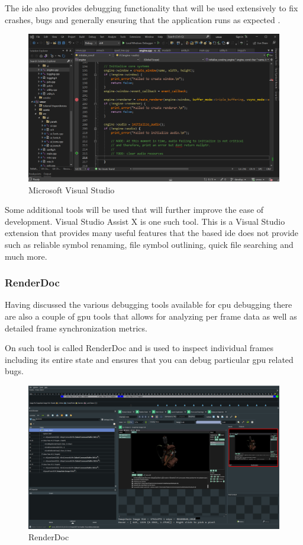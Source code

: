 \documentclass[11pt]{article}
\begin{document}
The \gls{ide} also provides debugging functionality that will be used
extensively to fix crashes, bugs and generally ensuring that the application
runs as expected \cite{visualstudio}. 

\begin{figure}[h!]
  \centering
  \includegraphics[width=\textwidth]{images/visual_studio.png}
  \caption{Microsoft Visual Studio}
  \label{fig:visual_studio}
\end{figure}

Some additional tools will be used that will further improve the ease of
development.  Visual Studio Assist X \cite{visualstudioassistx} is one such
tool. This is a Visual Studio extension that provides many useful features that
the based \gls{ide} does not provide such as reliable symbol renaming, file symbol
outlining, quick file searching and much more.


\subsubsection{RenderDoc}
Having discussed the various debugging tools available for \gls{cpu} debugging
there are also a couple of \gls{gpu} tools that allows for analyzing per frame
data as well as detailed frame synchronization metrics.

On such tool is called RenderDoc \cite{renderdoc} and is used to inspect
individual frames including its entire state and ensures that you can debug
particular \gls{gpu} related bugs.

\begin{figure}[h!]
  \centering
  \includegraphics[width=\textwidth]{images/renderdoc.png}
  \caption{RenderDoc}
  \label{fig:renderdoc}
\end{figure}
\end{document}
